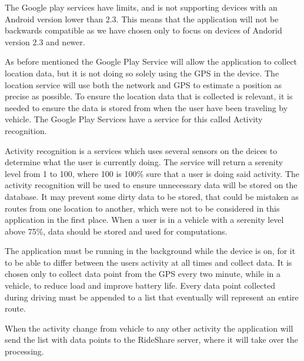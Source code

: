 The Google play services have limits, and is not supporting devices with an Android version lower than 2.3. This means that the application will not be backwards compatible as we have chosen only to focus on devices of Andorid version 2.3 and newer.

As before mentioned the Google Play Service will allow the application to collect location data, but it is not doing so solely using the GPS in the device. The location service will use both the network and GPS to estimate a position as precise as possible\cite{GapiLocation}. To ensure the location data that is collected is relevant, it is needed to ensure the data is stored from when the user have been traveling by vehicle.
The Google Play Services have a service for this called Activity recognition. 

Activity recognition is a services which uses several sensors on the deices to determine what the user is currently doing. The service will return a serenity level from 1 to 100, where 100 is 100\% sure that a user is doing said activity.
The activity recognition will be used to ensure unnecessary data will be stored on the database. It may prevent some dirty data to be stored, that could be mistaken as routes from one location to another, which were not to be considered in this application in the first place. When a user is in a vehicle with a serenity level above 75\%, data should be stored and used for computations.

The application must be running in the background while the device is on, for it to be able to differ between the users activity at all times and collect data. It is chosen only to  collect data point from the GPS every two minute, while in a vehicle, to reduce load and improve battery life. Every data point collected during driving must be appended to a list that eventually will represent an entire route.

When the activity change from vehicle to any other activity the application will send the list with data points to the RideShare server, where it will take over the processing. 